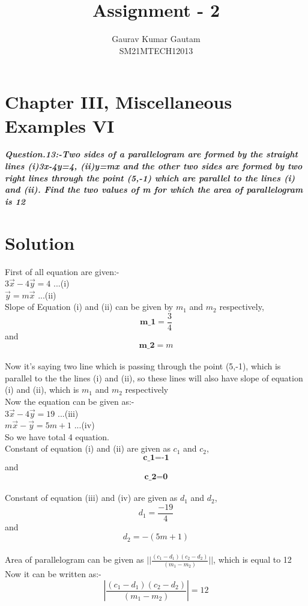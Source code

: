 \documentclass[journal,12pt,twocolumn]{IEEEtran}
\begin{document}
\title{
Assignment - 2
}
\author{ Gaurav Kumar Gautam \\SM21MTECH12013}
\maketitle
\newpage
\bigskip

\section*{\textbf{Chapter III, Miscellaneous Examples VI}}
\noindent
\textbf{\textsl{Question.13:-Two sides of a parallelogram are formed by the straight lines (i)3x-4y=4, (ii)y=mx and the other two sides are formed by two right lines through the point (5,-1) which are parallel to the lines (i) and (ii). Find the two values of m for which the area of parallelogram is 12}}\\[6pt]

\section*{\textbf{Solution}}

First of all equation are given:- \\

$3\vec{x}-4\vec{y}=4$          ...(i)\\
$\vec{y}=m\vec{x}$             ...(ii)
\\

Slope of Equation (i) and (ii) can be given by $m_1$ and $m_2$ respectively,
$$\textbf{m_1}=\frac{3}{4}$$ and $$\textbf{m_2}=m$$\\
Now it's saying two line which is passing through the point (5,-1), which is parallel to the the lines (i) and (ii), so these lines will also have slope of equation (i) and (ii), which is $m_1$ and $m_2$ respectively\\
Now the equation can be given as:-\\[6pt]
$3\vec{x}-4\vec{y}=19$     ...(iii)\\
$m\vec{x}-\vec{y}=5m+1$    ...(iv)\\
So we have total 4 equation.\\
Constant of equation (i) and (ii) are given as $c_1$ and $c_2$,\\
$$\textbf{c_1=-1}$$ and $$\textbf{c_2=0}$$\\
Constant of equation (iii) and (iv) are given as $d_1$ and $d_2$,\\
$$d_1=\frac{-19}{4}$$ and $$d_2=-(5m+1)$$\\
Area of parallelogram can be given as $||\frac{(c_1-d_1)(c_2-d_2)}{(m_1-m_2)}||$, which is equal to 12\\
Now it can be written as:-\\
$$|\frac{(c_1-d_1)(c_2-d_2)}{(m_1-m_2)}|=12$$\\
\end{document}
